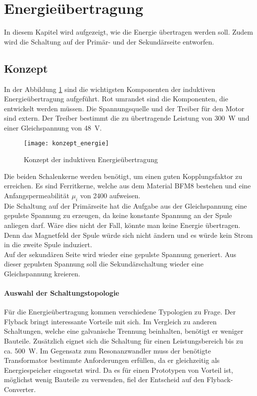 \section{Energieübertragung}\label{sec:energie}
In diesem Kapitel wird aufgezeigt, wie die Energie übertragen werden soll. Zudem wird die Schaltung auf der Primär- und der Sekundärseite entworfen.

\subsection{Konzept}
In der Abbildung \ref{fig:konzept_energie} sind die wichtigsten Komponenten der induktiven Energieübertragung aufgeführt. Rot umrandet sind die Komponenten, die entwickelt werden müssen. Die Spannungsquelle und der Treiber für den Motor sind extern. Der Treiber bestimmt die zu übertragende Leistung von \SI{300}{W} und einer Gleichspannung von \SI{48}{V}.

\begin{figure}[h]
	\centering
	\texttt{[image: konzept\_energie]}
	\caption{Konzept der induktiven Energieübertragung}\label{fig:konzept_energie}
\end{figure}

Die beiden Schalenkerne werden benötigt, um einen guten Kopplungsfaktor zu erreichen. Es sind Ferritkerne, welche aus dem Material BFM8 bestehen und eine Anfangspermeabilität $ \mu_{i} $ von 2400 aufweisen.\\
Die Schaltung auf der Primärseite hat die Aufgabe aus der Gleichspannung eine gepulste Spannung zu erzeugen, da keine konstante Spannung an der Spule anliegen darf. Wäre dies nicht der Fall, könnte man keine Energie übertragen. Denn das Magnetfeld der Spule würde sich nicht ändern und es würde kein Strom in die zweite Spule induziert. \\
Auf der sekundären Seite wird wieder eine gepulste Spannung generiert. Aus dieser gepulsten Spannung soll die Sekundärschaltung wieder eine Gleichspannung kreieren.

\paragraph{Auswahl der Schaltungstopologie}
Für die Energieübertragung kommen verschiedene Typologien zu Frage. Der Flyback bringt interessante Vorteile mit sich. Im Vergleich zu anderen Schaltungen, welche eine galvanische Trennung beinhalten, benötigt er weniger Bauteile. Zusätzlich eignet sich die Schaltung für einen Leistungsbereich bis zu ca. \SI{500}{W}. Im Gegensatz zum Resonanzwandler muss der benötigte Transformator bestimmte Anforderungen erfüllen, da er gleichzeitig als Energiespeicher eingesetzt wird. Da es für einen Prototypen von Vorteil ist, möglichst wenig Bauteile zu verwenden, fiel der Entscheid auf den Flyback-Converter. \cite{bachelor} \cite{sperrwandler}

